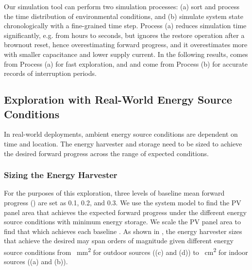 Our simulation tool can perform two simulation processes: (a) sort and process the time distribution of environmental conditions, and (b) simulate system state chronologically with a fine-grained time step. 
Process (a) reduces simulation time significantly, e.g. from hours to seconds, but ignores the restore operation after a brownout reset, hence overestimating forward progress, and it overestimates more with smaller capacitance and lower supply current. 
In the following results,  comes from Process (a) for fast exploration, and  and  come from Process (b) for accurate records of interruption periods. 

\subsection{Exploration with Real-World Energy Source Conditions} \label{subsec:harvstor}


In real-world deployments, ambient energy source conditions are dependent on time and location. 
The energy harvester and storage need to be sized to achieve the desired forward progress across the range of expected conditions. 

\subsubsection{Sizing the Energy Harvester}

For the purposes of this exploration, three levels of baseline mean forward progress () are set as 0.1, 0.2, and 0.3. 
We use the system model to find the PV panel area that achieves the expected forward progress under the different energy source conditions with minimum energy storage. 
We scale the PV panel area to find that which achieves each baseline . 
As shown in , the energy harvester sizes that achieve the desired  may span orders of magnitude given different energy source conditions from \SI{}{\square\milli\meter} for outdoor sources ((c) and (d)) to \SI{}{\square\centi\meter} for indoor sources ((a) and (b)).  

